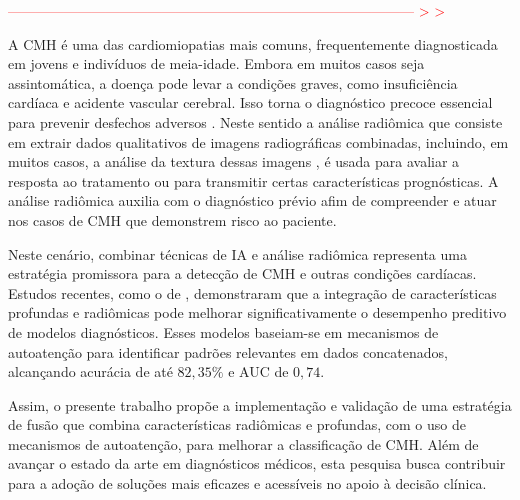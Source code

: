\textcolor{red}{--------------------------------------------------------------------------------------- > >}


A \gls{CMH} é uma das cardiomiopatias mais comuns, frequentemente diagnosticada em jovens e indivíduos de meia-idade. Embora em muitos casos seja assintomática, a doença pode levar a condições graves, como insuficiência cardíaca e acidente vascular cerebral. Isso torna o diagnóstico precoce essencial para prevenir desfechos adversos \cite{kwonComparisonMortalityCause2022}. Neste sentido a análise radiômica que consiste em extrair dados qualitativos de imagens radiográficas combinadas, incluindo, em muitos casos, a análise da textura dessas imagens \cite{lambinRadiomicsExtractingMore2012}, é usada para avaliar a resposta ao tratamento ou para transmitir certas características prognósticas. A análise radiômica auxilia com o diagnóstico prévio afim de compreender e atuar nos casos de \gls{CMH} que demonstrem risco ao paciente.


Neste cenário, combinar técnicas de \gls{IA} e análise radiômica representa uma estratégia promissora para a detecção de CMH e outras condições cardíacas. Estudos recentes, como o de , demonstraram que a integração de características profundas e radiômicas pode melhorar significativamente o desempenho preditivo de modelos diagnósticos. Esses modelos baseiam-se em mecanismos de autoatenção para identificar padrões relevantes em dados concatenados, alcançando acurácia de até $82,35\%$ e AUC de $0,74$.



Assim, o presente trabalho propõe a implementação e validação de uma estratégia de fusão que combina características radiômicas e profundas, com o uso de mecanismos de autoatenção, para melhorar a classificação de \gls{CMH}. Além de avançar o estado da arte em diagnósticos médicos, esta pesquisa busca contribuir para a adoção de soluções mais eficazes e acessíveis no apoio à decisão clínica.


